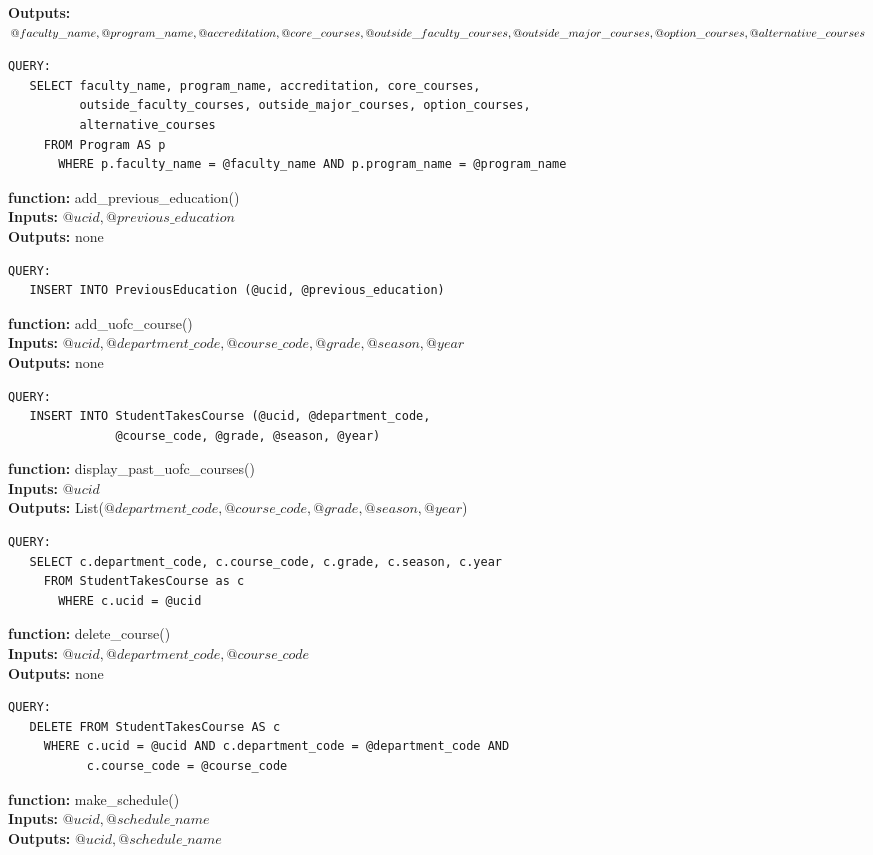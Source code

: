 \documentclass[12pt]{article} %
\begin{document}
\textbf{Outputs:} $@faculty\_name, @program\_name, @accreditation, @core\_courses, \\
        @outside\_faculty\_courses, @outside\_major\_courses, @option\_courses, @alternative\_courses$
\begin{verbatim}
QUERY:
   SELECT faculty_name, program_name, accreditation, core_courses, 
          outside_faculty_courses, outside_major_courses, option_courses, 
          alternative_courses
     FROM Program AS p
       WHERE p.faculty_name = @faculty_name AND p.program_name = @program_name
\end{verbatim} 
\textbf{function:} add\_previous\_education()\\
\textbf{Inputs:} $@ucid, @previous\_education$\\
\textbf{Outputs:} none
\begin{verbatim}
QUERY:
   INSERT INTO PreviousEducation (@ucid, @previous_education)
\end{verbatim} 
\textbf{function:} add\_uofc\_course()\\
\textbf{Inputs:} $@ucid, @department\_code, @course\_code, @grade, @season, @year$\\
\textbf{Outputs:} none
\begin{verbatim}
QUERY:
   INSERT INTO StudentTakesCourse (@ucid, @department_code, 
               @course_code, @grade, @season, @year)
\end{verbatim} 
\textbf{function:} display\_past\_uofc\_courses()\\
\textbf{Inputs:} $@ucid$\\
\textbf{Outputs:} List($@department\_code, @course\_code, @grade, @season, @year$)
\begin{verbatim}
QUERY:
   SELECT c.department_code, c.course_code, c.grade, c.season, c.year
     FROM StudentTakesCourse as c
       WHERE c.ucid = @ucid
\end{verbatim}
\textbf{function:} delete\_course()\\
\textbf{Inputs:} $@ucid, @department\_code, @course\_code$\\
\textbf{Outputs:} none
\begin{verbatim}
QUERY:
   DELETE FROM StudentTakesCourse AS c
     WHERE c.ucid = @ucid AND c.department_code = @department_code AND 
           c.course_code = @course_code
\end{verbatim}  
\textbf{function:} make\_schedule()\\
\textbf{Inputs:} $@ucid, @schedule\_name$\\
\textbf{Outputs:} $@ucid, @schedule\_name$\\
\end{document}
